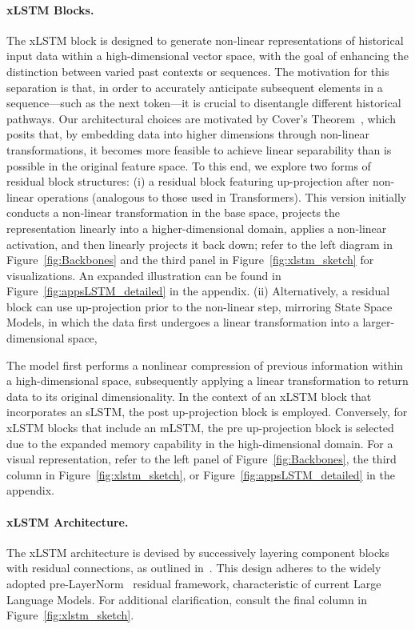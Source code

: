 \paragraph{xLSTM Blocks.}
\label{sec:xLSTMblock}
The xLSTM block is designed to generate non-linear representations of historical input data within a high-dimensional vector space, with the goal of enhancing the distinction between varied past contexts or sequences. The motivation for this separation is that, in order to accurately anticipate subsequent elements in a sequence—such as the next token—it is crucial to disentangle different historical pathways. Our architectural choices are motivated by Cover’s Theorem~\citep{Cover:65}, which posits that, by embedding data into higher dimensions through non-linear transformations, it becomes more feasible to achieve linear separability than is possible in the original feature space. To this end, we explore two forms of residual block structures: (i) a residual block featuring up-projection after non-linear operations (analogous to those used in Transformers). This version initially conducts a non-linear transformation in the base space, projects the representation linearly into a higher-dimensional domain, applies a non-linear activation, and then linearly projects it back down; refer to the left diagram in Figure~\ref{fig:Backbones}
and the third panel in Figure~\ref{fig:xlstm_sketch} for visualizations. 
An expanded illustration can be found in Figure~\ref{fig:appsLSTM_detailed}
in the appendix. (ii) Alternatively, a residual block can use up-projection prior to the non-linear step, mirroring State Space Models, in which the data first undergoes a linear transformation into a larger-dimensional space,

The model first performs a nonlinear compression of previous information within a high-dimensional space, subsequently applying a linear transformation to return data to its original dimensionality. In the context of an xLSTM block that incorporates an sLSTM, the post up-projection block is employed. Conversely, for xLSTM blocks that include an mLSTM, the pre up-projection block is selected due to the expanded memory capability in the high-dimensional domain. For a visual representation, refer to the left panel of Figure~\ref{fig:Backbones}, the third column in Figure~\ref{fig:xlstm_sketch}, or Figure~\ref{fig:appsLSTM_detailed} in the appendix.

\paragraph{xLSTM Architecture.}
\label{sec:xLSTMarchitecure}
The xLSTM architecture is devised by successively layering component blocks with residual connections, as outlined in~\citep{Srivastava:15,He:16}. This design adheres to the widely adopted pre-LayerNorm~\citep{Ba:16b} residual framework, characteristic of current Large Language Models. For additional clarification, consult the final column in Figure~\ref{fig:xlstm_sketch}.

